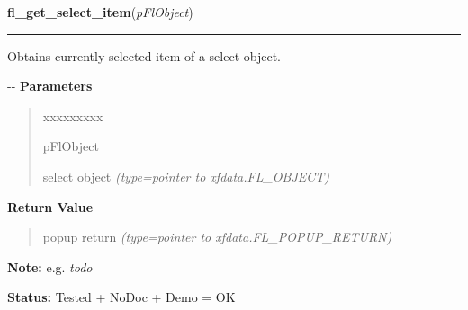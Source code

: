     \vspace{0.5ex}

\hspace{.8\funcindent}\begin{boxedminipage}{\funcwidth}

    \raggedright \textbf{fl\_get\_select\_item}(\textit{pFlObject})

    \vspace{-1.5ex}

    \rule{\textwidth}{0.5\fboxrule}
\setlength{\parskip}{2ex}

Obtains currently selected item of a select object.

-{}-
\setlength{\parskip}{1ex}
      \textbf{Parameters}
      \vspace{-1ex}

      \begin{quote}
        \begin{Ventry}{xxxxxxxxx}

          \item[pFlObject]


select object
            {\it (type=pointer to xfdata.FL\_OBJECT)}

        \end{Ventry}

      \end{quote}

      \textbf{Return Value}
    \vspace{-1ex}

      \begin{quote}

popup return
      {\it (type=pointer to xfdata.FL\_POPUP\_RETURN)}

      \end{quote}

\textbf{Note:} 
e.g. \emph{todo}


\textbf{Status:} 
Tested + NoDoc + Demo = OK


    \end{boxedminipage}

    \label{xformslib:flselect:fl_set_select_item}

    \vspace{0.5ex}

